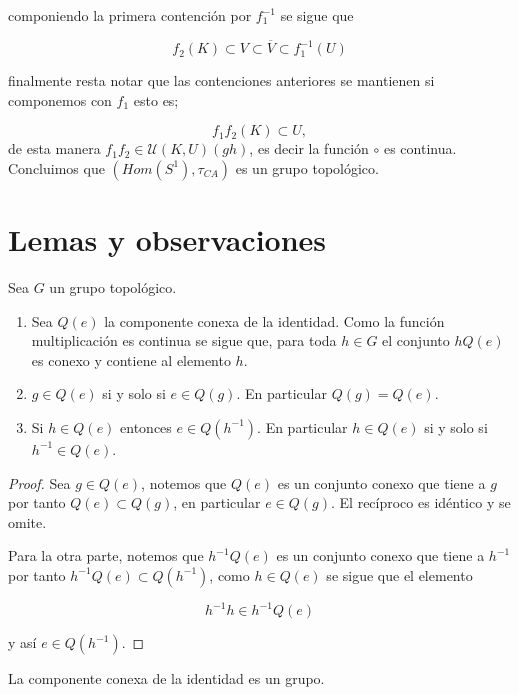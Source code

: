 componiendo la primera contención por $f_1^{-1}$ se sigue que

$$f_2(K) \subset V \subset \overline{V} \subset f_1^{-1}(U)$$

finalmente resta notar que las contenciones anteriores se mantienen si componemos con $f_1$ esto es;

$$f_1f_2(K) \subset U,$$
de esta manera $f_1f_2 \in \mathcal{U}(K,U)(gh)$, es decir la función $\circ$ es continua. Concluimos que $(Hom(S^1), \tau_{CA})$ es un grupo topológico. 


\section*{Lemas y observaciones}
	
\begin{ob}
	Sea $G$ un grupo topológico.
	
	\begin{enumerate}
	\item Sea $Q(e)$ la componente conexa de la identidad. Como la función multiplicación es continua se sigue que, para toda $h \in G$ el conjunto $hQ(e)$ es conexo y contiene al elemento $h$.

 \item $g \in Q(e)$ si y solo si $e \in Q(g).$ En particular $Q(g)=Q(e)$.
 
 \item  Si $h \in Q(e)$ entonces $e \in Q(h^{-1})$. En particular $h \in Q(e)$ si y solo si $h^{-1}\in Q(e)$.
	\end{enumerate}
 \end{ob}	
 
 \begin{proof}
 Sea $g \in Q(e)$, notemos que $Q(e)$ es un conjunto conexo que tiene a $g$ por tanto $Q(e) \subset Q(g)$, en particular $e \in Q(g).$ El recíproco es idéntico y se omite. 
 
 
Para la otra parte, notemos que $h^{-1}Q(e)$ es un conjunto conexo que tiene a $h^{-1}$ por tanto $h^{-1}Q(e) \subset Q(h^{-1})$, como $h \in Q(e)$ se sigue que el elemento

$$h^{-1}h \in h^{-1}Q(e)$$

y así $e \in Q(h^{-1})$.  
\end{proof}

\begin{lm}\label{lm:Q(e) es grupo}
La componente conexa de la identidad es un grupo.
\end{lm}


